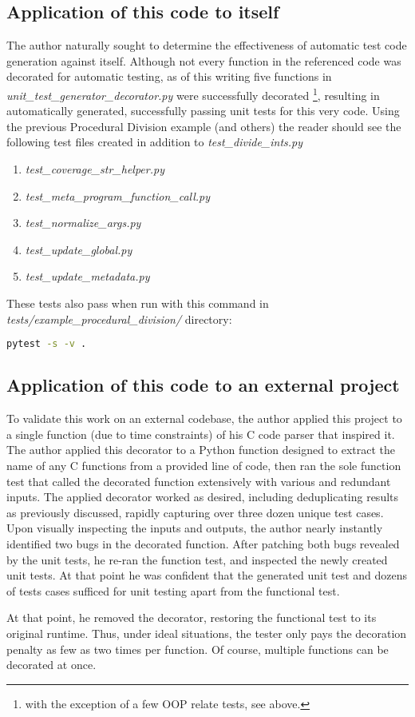 \subsection{Application of this code to itself}\label{sec:eval-2}

The author naturally sought to determine the effectiveness of automatic
test code generation against itself.  Although not 
every function in the referenced code was decorated for automatic testing, 
as of this writing five functions in 
\textit{unit\_test\_generator\_decorator.py} were successfully decorated
\footnote{with the exception of a few OOP relate tests, see above.}, 
resulting in automatically generated, successfully passing unit tests for this
very code.  Using the previous Procedural Division example (and others) 
the reader should see the following test files created in addition to 
\textit{test\_divide\_ints.py}

\begin{enumerate}
    \item \textit{test\_coverage\_str\_helper.py}
    \item \textit{test\_meta\_program\_function\_call.py}
    \item \textit{test\_normalize\_args.py}
    \item \textit{test\_update\_global.py}
    \item \textit{test\_update\_metadata.py}
\end{enumerate}

These tests also pass when run with this command in 
\linebreak
\textit{tests/example\_procedural\_division/} directory:
\begin{lstlisting}[language=bash, caption={Running all generated unit
   tests for the division example}]
    pytest -s -v .
\end{lstlisting}

\subsection{Application of this code to an external project}\label{sec:eval-2}
To validate this work on an external codebase, the author applied 
this project to a single function (due to time constraints) of his C code
parser that inspired it.  The author applied this
decorator to a Python function designed to extract the name of any C functions 
from a provided line of code, then ran the sole function test that called 
the decorated function extensively with various and redundant inputs.
The applied decorator worked as desired, including deduplicating results as
previously discussed, rapidly capturing over three dozen unique test cases.
Upon visually inspecting the inputs and outputs, the author 
nearly instantly identified two bugs in the decorated function.
%
After patching both bugs revealed by the unit tests, he re-ran the function test, 
and inspected the newly created unit tests. At that point he was confident that
the generated unit test and dozens of tests cases sufficed for unit testing apart 
from the functional test.

At that point, he removed the decorator, restoring the functional test to its 
original runtime. Thus, under ideal situations, the tester only pays the 
decoration penalty as few as two times per function.  Of course, multiple 
functions can be decorated at once.
%
